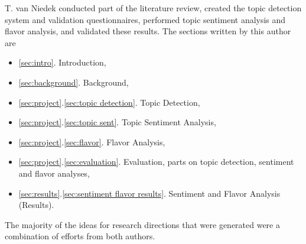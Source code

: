 \documentclass[final]{ieee}
\begin{document}
T. van Niedek conducted part of the literature review, created the topic detection system and validation questionnaires, performed topic sentiment analysis and flavor analysis, and validated these results. The sections written by this author are 
\begin{itemize}
\item \ref{sec:intro}. Introduction,
\item \ref{sec:background}. Background,
\item \ref{sec:project}.\ref{sec:topic detection}. Topic Detection,
\item \ref{sec:project}.\ref{sec:topic sent}. Topic Sentiment Analysis,
\item \ref{sec:project}.\ref{sec:flavor}. Flavor Analysis,
\item \ref{sec:project}.\ref{sec:evaluation}. Evaluation, parts on topic detection, sentiment and flavor analyses,
\item \ref{sec:results}.\ref{sec:sentiment flavor results}. Sentiment and Flavor Analysis (Results).
\end{itemize}

The majority of the ideas for research directions that were generated were a combination of efforts from both authors.
\end{document}
